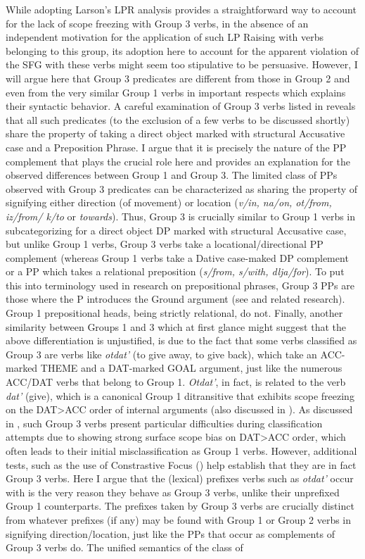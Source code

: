 \documentclass[output=paper,colorlinks,citecolor=brown,modfonts,nonflat]{langsci/langscibook}
\begin{document}
While adopting Larson's LPR analysis provides a straightforward way to account for the lack of scope freezing with Group 3 verbs, in the absence of an independent motivation for the application of such LP Raising with verbs belonging to this group, its adoption here to account for the apparent violation of the SFG with these verbs might seem too stipulative to be persuasive. However, I will argue here that Group 3 predicates are different from those in Group 2 and even from the very similar Group 1 verbs in important respects which explains their syntactic behavior. A careful examination of Group 3 verbs listed in  reveals that all such predicates (to the exclusion of a few verbs to be discussed shortly) share the property of taking a direct object marked with structural Accusative case and a Preposition Phrase. I argue that it is precisely the nature of the PP complement that plays the crucial role here and provides an explanation for the observed differences between Group 1 and Group 3. The limited class of PPs observed with Group 3 predicates can be characterized as sharing the property of signifying either direction (of movement) or location (\textit{v/in, na/on, ot/from, iz/from/ k/to} or \textit{towards}). Thus, Group 3 is crucially similar to Group 1 verbs in subcategorizing for a direct object DP marked with structural Accusative case, but unlike Group 1 verbs, Group 3 verbs take a locational/directional PP complement (whereas Group 1 verbs take a Dative case-maked DP complement or a PP which takes a relational preposition (\textit{s/from, s/with, dlja/for}). To put this into terminology used in research on prepositional phrases, Group 3 PPs are those where the P introduces the Ground argument (see \citealt{Svenonius2003,Svenonius2007} and related research). Group 1 prepositional heads, being strictly relational, do not. Finally, another similarity between Groups 1 and 3 which at first glance might suggest that the above differentiation is unjustified, is due to the fact that some verbs classified as Group 3 are verbs like \textit{otdat'} (to give away, to give back), which take an ACC-marked THEME and a DAT-marked GOAL argument, just like the numerous ACC/DAT verbs that belong to Group 1. \textit{Otdat'}, in fact, is related to the verb \textit{dat'} (give), which is a canonical Group 1 ditransitive that exhibits scope freezing on the DAT>ACC order of internal arguments (also discussed in \citealt{BonehNash2017}). As discussed in \citet{Antonyuk2015}, such Group 3 verbs present particular difficulties during classification attempts due to showing strong surface scope bias on DAT>ACC order, which often leads to their initial misclassification as Group 1 verbs. However, additional tests, such as the use of Constrastive Focus (\citealt{AntonyukLarson2016}) help establish that they are in fact Group 3 verbs. Here I argue that the (lexical) prefixes verbs such as \textit{otdat'} occur with is the very reason they behave as Group 3 verbs, unlike their unprefixed Group 1 counterparts. The prefixes taken by Group 3 verbs are crucially distinct from whatever prefixes (if any) may be found with Group 1 or Group 2 verbs in signifying direction/location, just like the PPs that occur as complements of Group 3 verbs do. The unified semantics of the class of 
\end{document}
